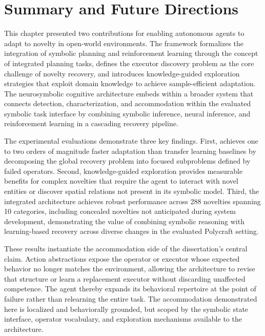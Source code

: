 \section{Summary and Future Directions}
\label{sec:rl_summary}

This chapter presented two contributions for enabling autonomous agents to adapt to novelty in open-world environments. The \RAPidLearn{} framework formalizes the integration of symbolic planning and reinforcement learning through the concept of integrated planning tasks, defines the executor discovery problem as the core challenge of novelty recovery, and introduces knowledge-guided exploration strategies that exploit domain knowledge to achieve sample-efficient adaptation. The neurosymbolic cognitive architecture embeds \RAPidLearn{} within a broader system that connects detection, characterization, and accommodation within the evaluated symbolic task interface by combining symbolic inference, neural inference, and reinforcement learning in a cascading recovery pipeline.

The experimental evaluations demonstrate three key findings. First, \RAPidLearn{} achieves one to two orders of magnitude faster adaptation than transfer learning baselines by decomposing the global recovery problem into focused subproblems defined by failed operators. Second, knowledge-guided exploration provides measurable benefits for complex novelties that require the agent to interact with novel entities or discover spatial relations not present in its symbolic model. Third, the integrated architecture achieves robust performance across 288 novelties spanning 10 categories, including concealed novelties not anticipated during system development, demonstrating the value of combining symbolic reasoning with learning-based recovery across diverse changes in the evaluated Polycraft setting.

These results instantiate the accommodation side of the dissertation's central claim. Action abstractions expose the operator or executor whose expected behavior no longer matches the environment, allowing the architecture to revise that structure or learn a replacement executor without discarding unaffected competence. The agent thereby expands its behavioral repertoire at the point of failure rather than relearning the entire task. The accommodation demonstrated here is localized and behaviorally grounded, but scoped by the symbolic state interface, operator vocabulary, and exploration mechanisms available to the architecture.


